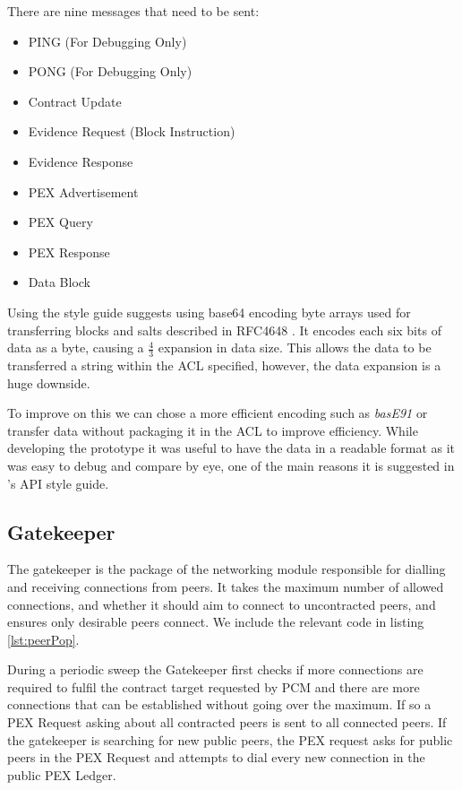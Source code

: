 \documentclass[11pt, a4paper, twocolumn, twoside]{report}
\begin{document}
There are nine messages that need to be sent:

\begin{itemize}
 \item PING (For Debugging Only)
 \item PONG (For Debugging Only)
 \item Contract Update
 \item Evidence Request (Block Instruction)
 \item Evidence Response
 \item PEX Advertisement
 \item PEX Query
 \item PEX Response
 \item Data Block
\end{itemize}

Using the style guide suggests using base64 encoding byte arrays used for transferring blocks and salts described in RFC4648 \citep{josefsson2006base16}. It encodes each six bits of data as a byte, causing a $\frac{4}{3}$ expansion in data size. This allows the data to be transferred a string within the ACL specified, however, the data expansion is a huge downside.

To improve on this we can chose a more efficient encoding such as \emph{basE91} \citep{joachim2015base91} or transfer data without packaging it in the ACL to improve efficiency. While developing the prototype it was useful to have the data in a readable format as it was easy to debug and compare by eye, one of the main reasons it is suggested in \cite{google2017api}'s API style guide.

\subsection{Gatekeeper}

The gatekeeper is the package of the networking module responsible for dialling and receiving connections from peers. It takes the maximum number of allowed connections, and whether it should aim to connect to uncontracted peers, and ensures only desirable peers connect. We include the relevant code in listing \ref{lst:peerPop}.

During a periodic sweep the Gatekeeper first checks if more connections are required to fulfil the contract target requested by PCM and there are more connections that can be established without going over the maximum. If so a PEX Request asking about all contracted peers is sent to all connected peers. If the gatekeeper is searching for new public peers, the PEX request asks for public peers in the PEX Request and attempts to dial every new connection in the public PEX Ledger.
\end{document}
